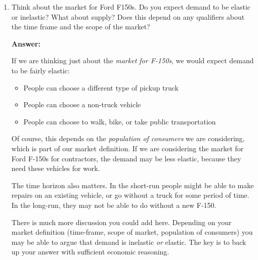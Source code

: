 \documentclass[12pt]{article}
\begin{document}
\begin{enumerate}
\vspace{5mm}

\item Think about the market for Ford F150s. Do you expect demand to be elastic or inelastic? What about supply? Does this depend on any qualifiers about the time frame and the scope of the market?

\vspace{5mm}

\textbf{Answer:}

\vspace{2mm}

If we are thinking just about the \textit{market for F-150s}, we would expect demand to be fairly elastic:
\begin{itemize}
    \item People can choose a different type of pickup truck
    \item People can choose a non-truck vehicle
    \item People can choose to walk, bike, or take public transportation
\end{itemize}

Of course, this depends on the \textit{population of consumers} we are considering, which is part of our market definition. If we are considering the market for Ford F-150s for contractors, the demand may be less elastic, because they need these vehicles for work.

\vspace{2mm}

The time horizon also matters. In the short-run people might be able to make repairs on an existing vehicle, or go without a truck for some period of time. In the long-run, they may not be able to do without a new F-150.

\vspace{2mm}

There is much more discussion you could add here. Depending on your market definition (time-frame, scope of market, population of consumers) you may be able to argue that demand is inelastic \textit{or} elastic. The key is to back up your answer with sufficient economic reasoning.


\end{enumerate}
\end{document}
